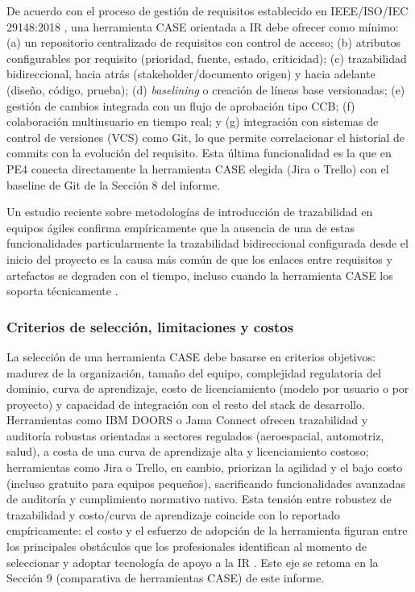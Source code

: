 \documentclass[journal,onecolumn]{IEEEtran}
\begin{document}
	De acuerdo con el proceso de gestión de requisitos establecido en IEEE/ISO/IEC 29148:2018 \cite{ieee29148}, una herramienta CASE orientada a IR debe ofrecer como mínimo: (a) un repositorio centralizado de requisitos con control de acceso; (b) atributos configurables por requisito (prioridad, fuente, estado, criticidad); (c) trazabilidad bidireccional, hacia atrás (stakeholder/documento origen) y hacia adelante (diseño, código, prueba); (d) \emph{baselining} o creación de líneas base versionadas; (e) gestión de cambios integrada con un flujo de aprobación tipo CCB; (f) colaboración multiusuario en tiempo real; y (g) integración con sistemas de control de versiones (VCS) como Git, lo que permite correlacionar el historial de commits con la evolución del requisito. Esta última funcionalidad es la que en PE4 conecta directamente la herramienta CASE elegida (Jira o Trello) con el baseline de Git de la Sección 8 del informe.
	
	Un estudio reciente sobre metodologías de introducción de trazabilidad en equipos ágiles confirma empíricamente que la ausencia de una de estas funcionalidades particularmente la trazabilidad bidireccional configurada desde el inicio del proyecto es la causa más común de que los enlaces entre requisitos y artefactos se degraden con el tiempo, incluso cuando la herramienta CASE los soporta técnicamente \cite{maro2022tracimo}.
	
	\subsubsection{Criterios de selección, limitaciones y costos}
	
	La selección de una herramienta CASE debe basarse en criterios objetivos: madurez de la organización, tamaño del equipo, complejidad regulatoria del dominio, curva de aprendizaje, costo de licenciamiento (modelo por usuario o por proyecto) y capacidad de integración con el resto del stack de desarrollo. Herramientas como IBM DOORS o Jama Connect ofrecen trazabilidad y auditoría robustas orientadas a sectores regulados (aeroespacial, automotriz, salud), a costa de una curva de aprendizaje alta y licenciamiento costoso; herramientas como Jira o Trello, en cambio, priorizan la agilidad y el bajo costo (incluso gratuito para equipos pequeños), sacrificando funcionalidades avanzadas de auditoría y cumplimiento normativo nativo. Esta tensión entre robustez de trazabilidad y costo/curva de aprendizaje coincide con lo reportado empíricamente: el costo y el esfuerzo de adopción de la herramienta figuran entre los principales obstáculos que los profesionales identifican al momento de seleccionar y adoptar tecnología de apoyo a la IR \cite{ozkaya2023}. Este eje se retoma en la Sección 9 (comparativa de herramientas CASE) de este informe.
	
\end{document}
